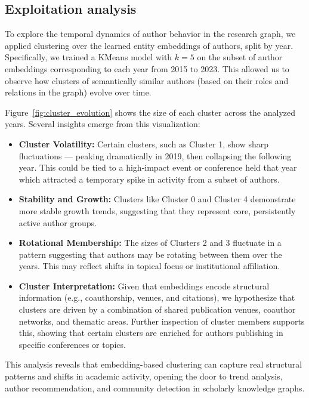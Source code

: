 \documentclass[10pt,a4paper]{article}
\begin{document}
\subsection{Exploitation analysis}

To explore the temporal dynamics of author behavior in the research graph, we applied clustering over the learned entity embeddings of authors, split by year. Specifically, we trained a KMeans model with $k=5$ on the subset of author embeddings corresponding to each year from 2015 to 2023. This allowed us to observe how clusters of semantically similar authors (based on their roles and relations in the graph) evolve over time.

Figure~\ref{fig:cluster_evolution} shows the size of each cluster across the analyzed years. Several insights emerge from this visualization:

\begin{itemize}
    \item \textbf{Cluster Volatility:} Certain clusters, such as Cluster 1, show sharp fluctuations — peaking dramatically in 2019, then collapsing the following year. This could be tied to a high-impact event or conference held that year which attracted a temporary spike in activity from a subset of authors.
    
    \item \textbf{Stability and Growth:} Clusters like Cluster 0 and Cluster 4 demonstrate more stable growth trends, suggesting that they represent core, persistently active author groups.

    \item \textbf{Rotational Membership:} The sizes of Clusters 2 and 3 fluctuate in a pattern suggesting that authors may be rotating between them over the years. This may reflect shifts in topical focus or institutional affiliation.

    \item \textbf{Cluster Interpretation:} Given that embeddings encode structural information (e.g., coauthorship, venues, and citations), we hypothesize that clusters are driven by a combination of shared publication venues, coauthor networks, and thematic areas. Further inspection of cluster members supports this, showing that certain clusters are enriched for authors publishing in specific conferences or topics.
\end{itemize}

This analysis reveals that embedding-based clustering can capture real structural patterns and shifts in academic activity, opening the door to trend analysis, author recommendation, and community detection in scholarly knowledge graphs.
\end{document}

